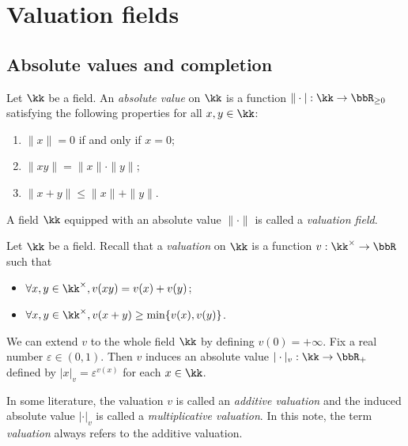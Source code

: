 \section{Valuation fields}

\subsection{Absolute values and completion}

    \begin{definition}\label{def:valuation_field}
        Let \(\kk\) be a field.
        An \emph{absolute value} on \(\kk\) is a function \(\|\cdot|:\kk\to\bbR_{\ge0}\) satisfying the following properties for all \(x,y\in\kk\):
        \begin{enumerate}
            \item \(\|x\|=0\) if and only if \(x=0\);
            \item \(\|xy\|=\|x\|\cdot\|y\|\);
            \item \(\|x+y\|\leq\|x\|+\|y\|\).
        \end{enumerate}
        A field \(\kk\) equipped with an absolute value \(\|\cdot\|\) is called a \emph{valuation field}.
    \end{definition}

    \begin{remark}\label{rmk:additive_and_multiplicative_valuation_on_a_field}
        Let \(\kk\) be a field.
        Recall that a \emph{valuation} on \(\kk\) is a function \(v: \kk^\times \to \bbR\) such that
        \begin{itemize}
            \item \(\forall x,y \in \kk^\times, v(xy) = v(x) + v(y)\);
            \item \(\forall x,y \in \kk^\times, v(x + y) \geq \min\{v(x), v(y)\}\).
        \end{itemize}
        We can extend \(v\) to the whole field \(\kk\) by defining \(v(0) = +\infty\).
        Fix a real number \(\varepsilon \in (0,1)\).
        Then \(v\) induces an absolute value \(|\cdot|_v: \kk \to \bbR_+\) defined by \(|x|_v = \varepsilon^{v(x)}\) for each \(x \in \kk\).

        In some literature, the valuation \(v\) is called an \emph{additive valuation} and the induced absolute value \(|\cdot|_v\) is called a \emph{multiplicative valuation}.
        In this note, the term \emph{valuation} always refers to the additive valuation.
    \end{remark}

